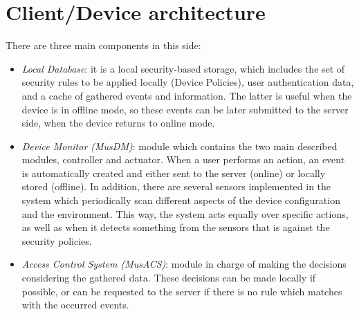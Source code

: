 \section{Client/Device architecture}
\label{subsec:client}

There are three main components in this side:
\begin{itemize}
 	 \item \textit{Local Database}: it is a local security-based storage, which includes the set of security rules to be applied locally (Device Policies), user authentication data, and a cache of gathered events and information. The latter is useful when the device is in offline mode, so these events can be later submitted to the server side, when the device returns to online mode. 
 	 \item \textit{Device Monitor (MusDM)}: module which contains the two main described modules, controller and actuator. When a user performs an action, an event is automatically created and either sent to the server (online) or locally stored (offline). In addition, there are several sensors implemented in the system which periodically scan different aspects of the device configuration and the environment. This way, the system acts equally over specific actions, as well as when it detects something from the sensors that is against the security policies.
 	 \item \textit{Access Control System (MusACS)}: module in charge of making the decisions considering the gathered data. These decisions can be made locally if possible, or can be requested to the server if there is no rule which matches with the occurred events. 

\end{itemize}


